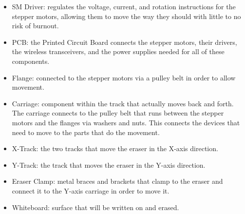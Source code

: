 \begin{itemize}
	\item SM Driver: regulates the voltage, current, and rotation instructions for the stepper motors, allowing them to move the way they should with little to no risk of burnout.
	\item PCB: the Printed Circuit Board connects the stepper motors, their drivers, the wireless transceivers, and the power supplies needed for all of these components.
	\item Flange: connected to the stepper motors via a pulley belt in order to allow movement.
	\item Carriage: component within the track that actually moves back and forth. The carriage connects to the pulley belt that runs between the stepper motors and the flanges via washers and nuts. This connects the devices that need to move to the parts that do the movement.
	\item X-Track: the two tracks that move the eraser in the X-axis direction.
	\item Y-Track: the track that moves the eraser in the Y-axis direction.
	\item Eraser Clamp: metal braces and brackets that clamp to the eraser and connect it to the Y-axis carriage in order to move it.
	\item Whiteboard: surface that will be written on and erased.
	 
\end{itemize} \par
